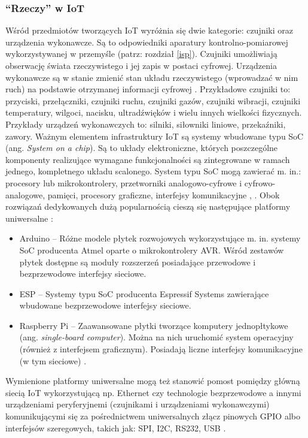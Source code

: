 \documentclass[a4paper, 12pt, twoside]{article}
\begin{document}
\subsubsection{``Rzeczy'' w IoT}

Wśród przedmiotów tworzących IoT wyróżnia się dwie kategorie: 
czujniki oraz urządzenia wykonawcze. Są to odpowiedniki aparatury kontrolno-pomiarowej 
wykorzystywanej w przemyśle (patrz: rozdział \ref{isp}). Czujniki umożliwiają
obserwację świata rzeczywistego i jej zapis w postaci cyfrowej.  
Urządzenia wykonawcze są w stanie zmienić stan układu rzeczywistego (wprowadzać w nim ruch)
na podstawie otrzymanej informacji cyfrowej \cite{iot-hype-to-reality}.
Przykładowe czujniki to: przyciski, przełączniki, czujniki ruchu, czujniki gazów,
czujniki wibracji, czujniki temperatury, wilgoci,
nacisku, ultradźwięków i wielu innych wielkości fizycznych. Przykłady urządzeń
wykonawczych to: silniki, siłowniki liniowe, przekaźniki, zawory. Ważnym elementem
infrastruktury IoT są systemy wbudowane typu SoC (ang. \emph{System on a chip}).  
Są to układy elektroniczne, których poszczególne komponenty realizujące wymagane 
funkcjonalności są zintegrowane w ramach jednego, kompletnego układu scalonego. 
System typu SoC mogą zawierać m. in.: procesory lub mikrokontrolery, przetworniki
analogowo-cyfrowe i cyfrowo-analogowe, pamięci, procesory graficzne, interfejsy komunikacyjne \cite{intro-to-iot}, \cite{soc}. 
Obok rozwiązań dedykowanych dużą popularnością cieszą się następujące platformy uniwersalne \cite{intro-to-iot}:

\begin{itemize}
    \itemsep0em 
    \item Arduino -- Różne modele płytek rozwojowych wykorzystujące m. in. systemy
    SoC producenta Atmel oparte o mikrokontrolery AVR. Wśród zestawów płytek
    dostępne są moduły rozszerzeń posiadające przewodowe i bezprzewodowe interfejsy sieciowe.
    \item ESP -- Systemy typu SoC producenta Espressif Systems zawierające wbudowane
    bezprzewodowe interfejsy sieciowe.
    \item Raspberry Pi -- Zaawansowane płytki tworzące komputery jednopłtykowe (ang. \emph{single-board computer}).    
    Można na nich uruchomić system operacyjny (również z interfejsem graficznym). Posiadają liczne 
    interfejsy komunikacyjne (w tym sieciowe) \cite{rpi}. 
\end{itemize}

Wymienione platformy uniwersalne mogą też stanowić pomost pomiędzy główną
siecią IoT wykorzystującą np. Ethernet czy technologie bezprzewodowe a innymi urządzeniami
peryferyjnemi (czujnikami i urządzeniami wykonawczymi) komunikującymi się za pośrednictwem 
uniwersalnych złącz pinowych GPIO albo interfejsów szeregowych, 
takich jak: SPI, I2C, RS232, USB \cite{intro-to-iot}.
\end{document}
